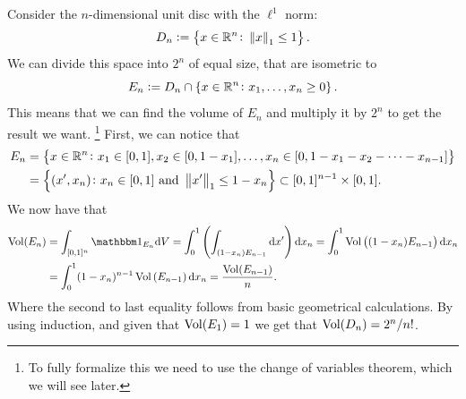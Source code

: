 \documentclass[11pt,a4paper]{article}
\begin{document}
\begin{example}
  \label{example:vol-of-ball-under-ell-one-norm}
  Consider the $n$-dimensional unit disc with the $\ell^1$ norm:
  \[
    D_n := \left\{x \in \mathbb{R}^n \colon \left\lVert x\right\rVert_1 \le 1\right\}.
  \]
  We can divide this space into $2^n$ of equal size,
  that are isometric to
  \[
    E_n := D_n \cap \left\{x \in \mathbb{R}^n \colon x_1,\dots,x_n \geq 0\right\}.
  \]
  This means that we can find the volume of $E_n$ and multiply it by
  $2^n$ to get the result we want.
  \footnote{To fully formalize this we need to use the change of variables
  theorem, which we will see later.}
  First, we can notice that
  \begin{align*}
    E_n &=
    \left\{x \in \mathbb{R}^n \colon x_1 \in [0,1], x_2 \in [0,1 - x_1], \dots,
    x_n \in [0,1 - x_1 - x_2 - \cdots - x_{n-1}]\right\} \\ &=
    \left\{(x',x_n) \colon x_n \in [0,1] \text{ and } \left\lVert x'\right\rVert_1 \le 1 - x_n\right\}
    \subset [0,1]^{n-1} \times [0,1].
  \end{align*}
  We now have that
  \begin{align*}
    \Vol(E_n) &=
    \int_{[0,1]^n} \ind_{E_n} \dV =
    \int_{0}^{1} \del{\int_{(1-x_n) E_{n-1}} \dx'} \dx_n =
    \int_{0}^{1} \Vol\del{(1 - x_n) E_{n-1}} \dx_n \\ &=
    \int_{0}^{1} (1 - x_n)^{n-1} \Vol\del{E_{n-1}} \dx_n =
    \frac{\Vol(E_{n-1})}{n}.
  \end{align*}
  Where the second to last equality follows from basic
  geometrical calculations.
  By using induction, and given that $\operatorname{Vol}(E_1) = 1$ we get
  that $\operatorname{Vol}(D_n) = 2^n / n!$.
\end{example}
\end{document}
